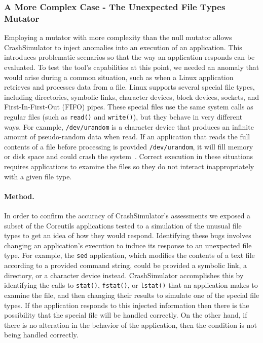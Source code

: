 \subsubsection{A More Complex Case - The Unexpected File Types Mutator}
\label{sec-file-type-bugs}

Employing a mutator
with more complexity than the null mutator
allows CrashSimulator to inject anomalies into an execution
of an application.
This introduces problematic scenarios
so that the way an application responds
can be evaluated.
To test
the tool's capabilities
at this point,
we needed an anomaly
that would arise during a common situation,
such as when a Linux application retrieves
and processes data from a file.
Linux supports
several special file types,
including
directories,
symbolic links,
character devices,
block devices,
sockets, and
First-In-First-Out (FIFO) pipes.
These special files
use the same system calls
as regular files
(such as {\tt read()} and {\tt write()}),
but they behave in very different ways.
For example,
{\tt /dev/urandom} is a character device
that produces an infinite amount
of pseudo-random data
when read.
If an application that reads the full
contents of a file before processing is provided {\tt /dev/urandom}, it
will fill memory or disk space and could
crash the system~\cite{YumAptEndless}.
Correct execution in these situations
requires applications
to examine the files so they do not
interact inappropriately with a given file type.

\paragraph{Method.}
In order to confirm the accuracy of CrashSimulator's assessments we
exposed a subset of the Coreutils applications tested to
a simulation of the unusual file
types to get an idea of how they would respond.
Identifying these bugs involves changing an application's
execution to induce its response to an unexpected file type.  For
example, the {\tt sed} application, which modifies the contents of a text
file according to a provided command string, could be provided a symbolic
link, a directory, or a character device instead.  CrashSimulator
accomplishes this by identifying the calls to {\tt stat()}, {\tt fstat()},
or {\tt lstat()} that an application makes to examine the file, and then
changing their results to simulate
one of the special file types.  If the application responds to
this injected information then there is the possibility that the special
file will be handled correctly.  On the other hand, if there is no
alteration in the behavior of the application,  then the condition is not
being handled correctly.

